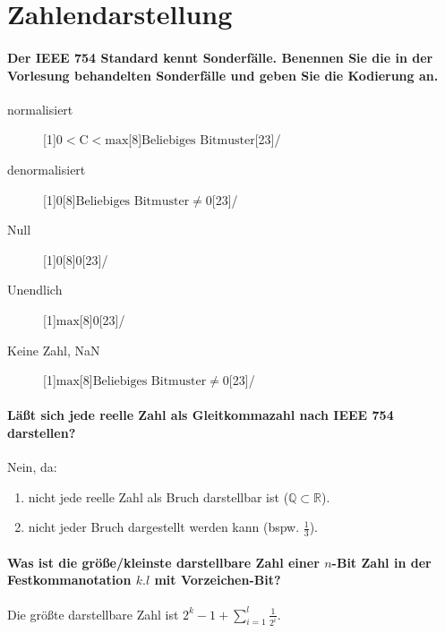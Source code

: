 	\section{Zahlendarstellung}
		\paragraph{Der IEEE 754 Standard kennt Sonderfälle. Benennen Sie die in der Vorlesung behandelten Sonderfälle und geben Sie die Kodierung an.}
			\begin{description}
				\item[normalisiert]    \bitpattern[startBit = 31, noBitNumbers]{$ \pm $}[1]{$ 0 < \text{C} < \text{max} $}[8]{$ \text{Beliebiges Bitmuster} $}[23]/
				\item[denormalisiert]  \bitpattern[startBit = 31, noBitNumbers]{$ \pm $}[1]{$ 0 $}[8]{$ \text{Beliebiges Bitmuster} \neq 0 $}[23]/
				\item[Null]            \bitpattern[startBit = 31, noBitNumbers]{$ \pm $}[1]{$ 0 $}[8]{$ 0 $}[23]/
				\item[Unendlich]       \bitpattern[startBit = 31, noBitNumbers]{$ \pm $}[1]{$ \text{max} $}[8]{$ 0 $}[23]/
				\item[Keine Zahl, NaN] \bitpattern[startBit = 31, noBitNumbers]{$ \pm $}[1]{$ \text{max} $}[8]{$ \text{Beliebiges Bitmuster} \neq 0 $}[23]/
			\end{description}

		\paragraph{Läßt sich jede reelle Zahl als Gleitkommazahl nach IEEE 754 darstellen?}
			Nein, da:
			\begin{enumerate}
				\item nicht jede reelle Zahl als Bruch darstellbar ist ($ \mathbb{Q} \subset \mathbb{R} $).
				\item nicht jeder Bruch dargestellt werden kann (bspw. $ \frac{1}{3} $).
			\end{enumerate}

		\paragraph{Was ist die größe/kleinste darstellbare Zahl einer $ n $-Bit Zahl in der Festkommanotation $ k.l $ mit Vorzeichen-Bit?}
			Die größte darstellbare Zahl ist $ 2 ^ k - 1 + \sum _ { i = 1 } ^ { l } \frac{1}{2 ^ i} $.

